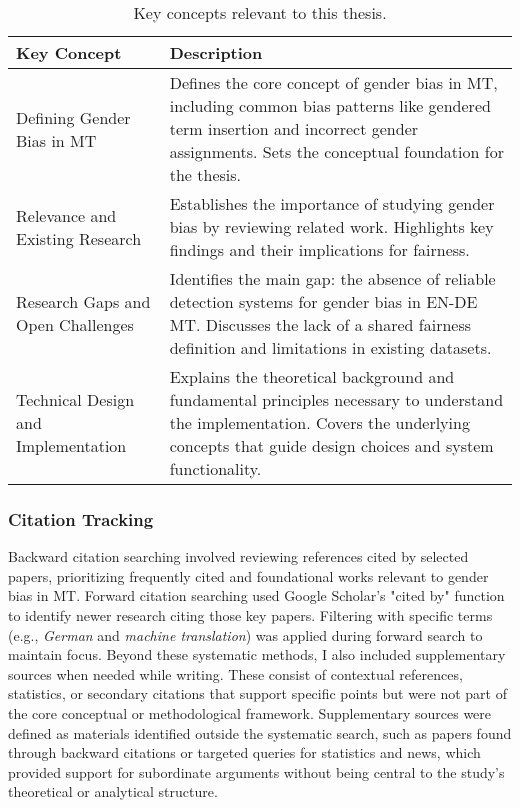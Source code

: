         \vspace{0.8em}
        \renewcommand{\arraystretch}{1.3}
            \begin{table}[ht!]
            \centering
            \begin{tabularx}{\textwidth}{>{\raggedright\arraybackslash}p{6.5cm}X}
            \toprule
            \textbf{Key Concept} & \textbf{Description} \\
            \midrule

            Defining Gender Bias in MT & Defines the core concept of gender bias in MT, including common bias patterns like gendered term insertion and incorrect gender assignments. Sets the conceptual foundation for the thesis. \\

            Relevance and Existing Research & Establishes the importance of studying gender bias by reviewing related work. Highlights key findings and their implications for fairness. \\

            Research Gaps and Open Challenges & Identifies the main gap: the absence of reliable detection systems for gender bias in EN-DE MT. Discusses the lack of a shared fairness definition and limitations in existing datasets. \\

            Technical Design and Implementation & Explains the theoretical background and fundamental principles necessary to understand the implementation. Covers the underlying concepts that guide design choices and system functionality. \\

            \bottomrule
            \end{tabularx}
            \caption{Key concepts relevant to this thesis.}
            \label{tab:key-concepts}
        \end{table}


        \subsubsection{Citation Tracking}
        Backward citation searching involved reviewing references cited by selected papers, prioritizing frequently cited and foundational works relevant to gender bias in MT. Forward citation searching used Google Scholar's "cited by" function to identify newer research citing those key papers. Filtering with specific terms (e.g., \textit{German} and \textit{machine translation}) was applied during forward search to maintain focus. Beyond these systematic methods, I also included supplementary sources when needed while writing. These consist of contextual references, statistics, or secondary citations that support specific points but were not part of the core conceptual or methodological framework. Supplementary sources were defined as materials identified outside the systematic search, such as papers found through backward citations or targeted queries for statistics and news, which provided support for subordinate arguments without being central to the study's theoretical or analytical structure.

